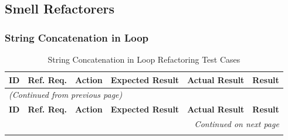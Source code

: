 \documentclass[12pt, titlepage]{article}
\begin{document}
\subsection{Smell Refactorers}

\subsubsection{String Concatenation in Loop}

\begin{longtable}{c
    >{\raggedright\arraybackslash}p{1.5cm}
    >{\raggedright\arraybackslash}p{4.5cm}
    >{\raggedright\arraybackslash}p{4cm}
  >{\raggedright\arraybackslash}p{3cm} c}
  \toprule
  \textbf{ID} & \textbf{Ref. Req.} & \textbf{Action} &
  \textbf{Expected Result} & \textbf{Actual Result} & \textbf{Result} \\
  \midrule
  \endfirsthead

  \multicolumn{6}{l}{\textit{(Continued from previous page)}} \\
  \toprule
  \textbf{ID} & \textbf{Ref. Req.} & \textbf{Action} &
  \textbf{Expected Result} & \textbf{Actual Result} & \textbf{Result} \\
  \midrule
  \endhead

  \multicolumn{6}{r}{\textit{Continued on next page}} \\
  \endfoot

  \bottomrule
  \caption{String Concatenation in Loop Refactoring Test Cases}
  \label{table:string_concat_refactoring_tests}
  \endlastfoot


\end{longtable}
\end{document}
